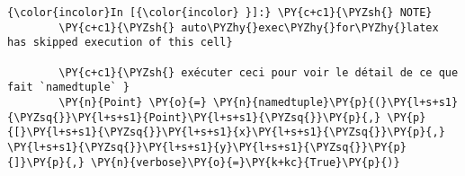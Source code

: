     \begin{Verbatim}[commandchars=\\\{\},frame=single,framerule=0.3mm,rulecolor=\color{cellframecolor}]
{\color{incolor}In [{\color{incolor} }]:} \PY{c+c1}{\PYZsh{} NOTE}
        \PY{c+c1}{\PYZsh{} auto\PYZhy{}exec\PYZhy{}for\PYZhy{}latex has skipped execution of this cell}
        
        \PY{c+c1}{\PYZsh{} exécuter ceci pour voir le détail de ce que fait `namedtuple` }
        \PY{n}{Point} \PY{o}{=} \PY{n}{namedtuple}\PY{p}{(}\PY{l+s+s1}{\PYZsq{}}\PY{l+s+s1}{Point}\PY{l+s+s1}{\PYZsq{}}\PY{p}{,} \PY{p}{[}\PY{l+s+s1}{\PYZsq{}}\PY{l+s+s1}{x}\PY{l+s+s1}{\PYZsq{}}\PY{p}{,} \PY{l+s+s1}{\PYZsq{}}\PY{l+s+s1}{y}\PY{l+s+s1}{\PYZsq{}}\PY{p}{]}\PY{p}{,} \PY{n}{verbose}\PY{o}{=}\PY{k+kc}{True}\PY{p}{)}
\end{Verbatim}



    
    
    
